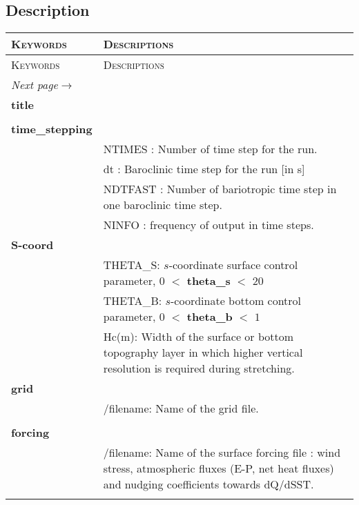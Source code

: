 \subsection{Description}
\begin{longtable}{|p{0.25\linewidth}|p{0.75\linewidth}|}
 \hline
 \textsc{Keywords}  &  \textsc{Descriptions} \\
 \endfirsthead
\hline
 \textsc{Keywords}  &  \textsc{Descriptions} \\
   \hline
   \endhead
   \hline
   \multicolumn{2}{|p{0.6666\linewidth}|}{\textit{Next page}$\rightarrow$} \\
   \hline
   \endfoot
    \endlastfoot 
\hline
\large{\textbf{title}} &  \\
&   \\ 
\large{\textbf{time\_stepping}} &     \\ 
&   NTIMES : Number of time step for the run. \\ 
&   dt  : Baroclinic time step for the run [in s] \\ 
&   NDTFAST : Number of bariotropic time step in one baroclinic time step.  \\
&   NINFO : frequency of output in time steps. \\

\large{\textbf{S-coord}} &    \\ 
&  THETA\_S: $s$-coordinate surface control parameter,
$0$ $<$ \textbf{theta\_s} $<$ $20$ \\ 
&  THETA\_B: $s$-coordinate bottom control parameter,
$0$ $<$ \textbf{theta\_b} $<$ $1$ \\ 
&  Hc(m): Width of the surface or bottom topography layer in which higher vertical
resolution is required during stretching. \\ 

\large{\textbf{grid}} &    \\
&/filename:  Name of the grid file. \\ 
&  \\ 

\large{\textbf{forcing}} &     \\
&/filename: Name of the surface forcing file : wind stress, atmospheric fluxes (E-P,
net heat fluxes) and nudging coefficients towards dQ/dSST.\\
&  \\


\end{longtable}
